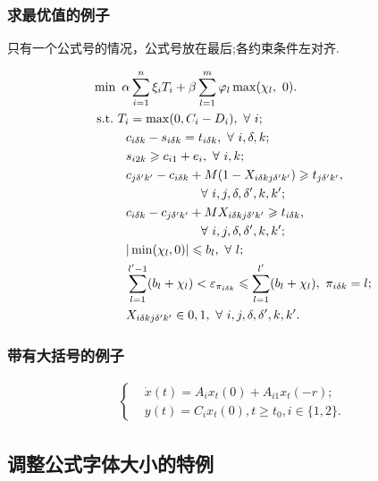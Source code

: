 \documentclass{ctacn}%
\begin{document}
\begin{multicols}{2}
\subsubsection{求最优值的例子}
只有一个公式号的情况，公式号放在最后;各约束条件左对齐.
\begin{center}

\begin{align}
&\min~\alpha\sum\limits_{i=1}^n\xi_{i}T_{i}+\beta \sum\limits_{l=1}^m \varphi_{l} \max(\chi_{l},~0).\notag\\
&{\rm{~s.t.~}}T_{i}=\max(0,C_i-D_i),~\forall~i;\notag\\
&~~~~~~~~c_{i \delta k}-s_{i \delta k}=t_{i \delta k},~\forall~i,\delta,k;\notag\\
&~~~~~~~~s_{i 2 k}\geqslant c_{i 1 }+e_i,~\forall~i,k;\notag\\
&~~~~~~~~c_{j \delta' k'}-c_{i \delta k}+M(1-X_{i \delta k j\delta'k'})\geqslant t_{j \delta' k'},\notag\\
&~~~~~~~~~~~~~~~~~~~~~~~~~~\forall~i,j,\delta,\delta',k,k';\notag\\
&~~~~~~~~c_{i \delta k}-c_{j \delta' k'}+M X_{i \delta k j\delta'k'}\geqslant t_{i \delta k},\notag\\
&~~~~~~~~~~~~~~~~~~~~~~~~~~\forall~i,j,\delta,\delta',k,k';\notag\\
&~~~~~~~~|\min(\chi_{l},0)|\leqslant b_l,~\forall~ l;\notag\\
&~~~~~~~~\sum\limits_{l=1}^{l'-1} (b_{l}+\chi_{l})< \varepsilon_{\pi_{i \delta k}}\leqslant  \sum\limits_{l=1}^{l'} (b_{l}+\chi_{l}),~\pi_{i \delta k}=l;\notag\\
&~~~~~~~~X_{i \delta k j\delta'k'} \in {0,1},~\forall~ i,j,\delta,\delta',k,k'.
\end{align}
\end{center}


\subsubsection{带有大括号的例子}\vspace{-15pt}
\begin{align}
\left\{\begin{aligned}
&\dot{x}(t)=A_{i}x_{t}(0)+A_{i1}x_{t}(-r);\\
&y(t)=C_{i}x_{t}(0),t\geqslant t_{0}, i\in\{1, 2\}.
\end{aligned}\right.
\end{align}


\subsection{调整公式字体大小的特例}


\end{multicols}
\end{document}

